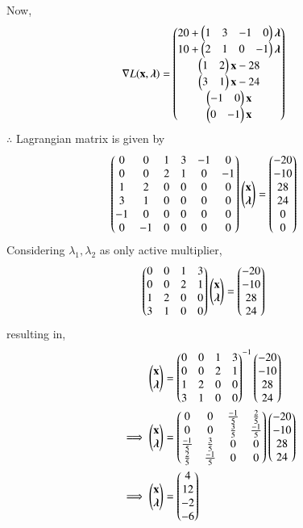 \documentclass[journal,12pt,twocolumn]{IEEEtran}
\begin{document}
Now,
\begin{align}
\nabla L(\mathbf{x},\boldsymbol{\lambda}) &= \begin{pmatrix}20+ \begin{pmatrix}1 & 3  & -1 & 0 \end{pmatrix}\boldsymbol{\lambda}\\ 10+\begin{pmatrix}2 & 1 & 0 & -1\end{pmatrix}\boldsymbol{\lambda} \\ \begin{pmatrix}1 & 2\end{pmatrix}\mathbf{x}-28 \\ \begin{pmatrix}3 & 1\end{pmatrix}\mathbf{x}-24 \\  \begin{pmatrix}-1 & 0\end{pmatrix}\mathbf{x} \\ \begin{pmatrix}0 & -1\end{pmatrix}\mathbf{x}\end{pmatrix}
\end{align}
$\therefore$ Lagrangian matrix is given by
\begin{align}
\begin{pmatrix}0 & 0 & 1 & 3 & -1 & 0 \\ 0 & 0 & 2 & 1  & 0 & -1 \\ 1 & 2 & 0 & 0 & 0 & 0 \\ 3 & 1 & 0 & 0 & 0 & 0  \\ -1 & 0 & 0 & 0 & 0 & 0  \\ 0 & -1 & 0 & 0 & 0 & 0 \end{pmatrix}\begin{pmatrix}\mathbf{x} \\ \boldsymbol{\lambda} \end{pmatrix} &= \begin{pmatrix}-20 \\ -10 \\ 28 \\ 24 \\ 0 \\0 \end{pmatrix}
\end{align}
Considering $\lambda_1,\lambda_2$ as only active multiplier,
\begin{align}
\begin{pmatrix}0 & 0 & 1 & 3 \\ 0 & 0 & 2 & 1 \\ 1 & 2 & 0 & 0 \\ 3 & 1 & 0 & 0\end{pmatrix}\begin{pmatrix}\mathbf{x}\\ \boldsymbol{\lambda}\end{pmatrix} &= \begin{pmatrix}-20 \\ -10 \\ 28 \\ 24\end{pmatrix}
\end{align}
resulting in,
\begin{align}
\begin{pmatrix}\mathbf{x} \\ \boldsymbol{\lambda}\end{pmatrix} &= \begin{pmatrix}0 & 0 & 1 & 3 \\ 0 & 0 & 2 & 1 \\ 1 & 2 & 0 & 0 \\ 3 & 1 & 0 & 0\end{pmatrix}^{-1}\begin{pmatrix}-20 \\ -10 \\ 28 \\ 24\end{pmatrix}
\\
\implies   \begin{pmatrix}\mathbf{x} \\ \boldsymbol{\lambda}\end{pmatrix} &= \begin{pmatrix}0 & 0 & \frac{-1}{5} & \frac{2}{5} \\ 0 & 0 & \frac{3}{5} & \frac{-1}{5} \\ \frac{-1}{5} & \frac{3}{5} & 0 & 0 \\ \frac{2}{5} & \frac{-1}{5} & 0 & 0\end{pmatrix}\begin{pmatrix}-20 \\ -10 \\ 28 \\ 24\end{pmatrix}
\\
\implies \begin{pmatrix}\mathbf{x} \\ \boldsymbol{\lambda}\end{pmatrix} &= \begin{pmatrix}4 \\ 12 \\ -2 \\ -6 \end{pmatrix}
\end{align}
\end{document}
